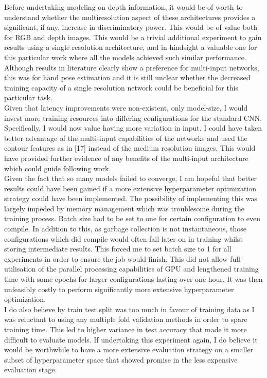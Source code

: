 \documentclass{article}
\begin{document}
Before undertaking modeling on depth information, it would be of worth to understand whether the multiresolution aspect of these architectures provides a significant, if any, increase in discriminatory power. This would be of value both for RGB and depth images. This would be a trivial additional experiment to gain results using a single resolution architecture, and in hindsight a valuable one for this particular work where all the models achieved such similar performance. Although results in literature clearly show a preference for multi-input networks, this was for hand pose estimation and it is still unclear whether the decreased training capacity of a single resolution network could be beneficial for this particular task. \\

Given that latency improvements were non-existent, only model-size, I would invest more training resources into differing configurations for the standard CNN. Specifically, I would now value having more variation in input. I could have taken better advantage of the multi-input capabilities of the networks and used the contour features as in [17] instead of the medium resolution images. This would have provided further evidence of any benefits of the multi-input architecture which could guide following work. \\

Given the fact that so many models failed to converge, I am hopeful that better results could have been gained if a more extensive hyperparameter optimization strategy could have been implemented. The possibility of implementing this was largely impeded  by memory management which was troublesome during the training process. Batch size had to be set to one for certain configuration to even compile. In addition to this, as garbage collection is not instantaneous, those configurations which did compile would often fail later on in training whilst storing intermediate results. This forced me to set batch size to 1 for all experiments in order to ensure the job would finish. This did not allow full utilisation of the parallel processing capabilities of GPU and lengthened training time with some epochs for larger configurations lasting over one hour. It was then unfeasibly costly to perform significantly more extensive hyperparameter optimization. \\

I do also believe by train test split was too much in favour of training data as I was reluctant to using any multiple fold validation methods in order to spare training time. This led to higher variance in test accuracy that made it more difficult to evaluate models. If undertaking this experiment again, I do believe it would be worthwhile to have a more extensive evaluation strategy on a smaller subset of hyperparameter space that showed promise in the less expensive evaluation stage. \\
\end{document}
